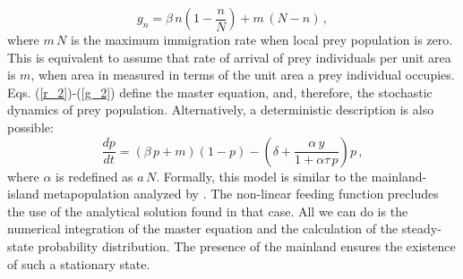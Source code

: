 \begin{equation}
g_{n} = \beta\,n\left(1-\frac{n}{N}\right)+m\,(N-n)\,,
\label{g_2}
\end{equation}
where $m\,N$ is the maximum immigration rate when local prey population is zero. This is equivalent to assume that rate of arrival of prey individuals per unit area is $m$, when area in measured in terms of the unit area a prey individual occupies. Eqs. (\ref{r_2})-(\ref{g_2}) define the master equation, and, therefore, the stochastic dynamics of prey population. Alternatively, a deterministic description is also possible:
\begin{equation}
\label{ex_3}
\frac{dp}{dt} = \left(\beta\,p+m\right)\left(1-p\right) - \left(\delta+\frac{\alpha\,y}{1+\alpha\tau\,p}\right)p\,,
\end{equation}
where $\alpha$ is redefined as $a\,N$. Formally, this model is similar to the mainland-island metapopulation analyzed by  \cite{AlonsoMcKane2002Extinction}. The non-linear feeding function precludes the use of the analytical solution found in that case. All we can do is the numerical integration of the master equation and the calculation of the steady-state probability distribution. The presence of the mainland ensures the existence of such a stationary state.
\smallskip 
 
